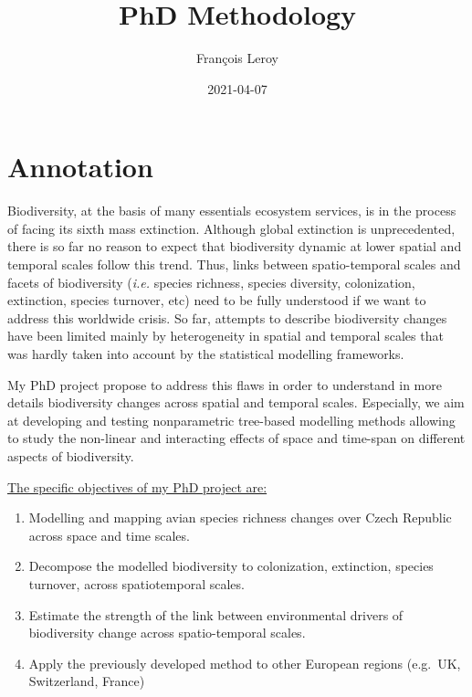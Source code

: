 \documentclass[
  12pt,
  oneside]{report}
\title{PhD Methodology}
\author{François Leroy}
\date{2021-04-07}
\providecommand{\tightlist}{%
  \setlength{\itemsep}{0pt}\setlength{\parskip}{0pt}}
\begin{document}
\maketitle


\cleardoublepage 
{}

{
\hypersetup{linkcolor=}
\setcounter{tocdepth}{1}
\tableofcontents
\newpage
}
\vspace{50mm}


\cleardoublepage 
{}


\hypertarget{annotation}{%
\chapter*{Annotation}\label{annotation}}

Biodiversity, at the basis of many essentials ecosystem services, is in the process of facing its sixth mass extinction. Although global extinction is unprecedented, there is so far no reason to expect that biodiversity dynamic at lower spatial and temporal scales follow this trend. Thus, links between
spatio-temporal scales and facets of biodiversity (\emph{i.e.} species richness, species diversity, colonization, extinction,
species turnover, etc) need to be fully understood if we want to address this worldwide crisis. So far,
attempts to describe biodiversity changes have been limited mainly by heterogeneity in spatial and
temporal scales that was hardly taken into account by the statistical modelling frameworks.

My PhD project propose to address this flaws in order to understand in more details biodiversity
changes across spatial and temporal scales. Especially, we aim at developing and testing nonparametric
tree-based modelling methods allowing to study the non-linear and interacting effects of
space and time-span on different aspects of biodiversity.

\underline{The specific objectives of my PhD project are:}

\begin{enumerate}
\def\labelenumi{\arabic{enumi}.}
\tightlist
\item
  Modelling and mapping avian species richness changes over Czech Republic across space and time
  scales.
\item
  Decompose the modelled biodiversity to colonization, extinction, species turnover, across spatiotemporal
  scales.
\item
  Estimate the strength of the link between environmental drivers of biodiversity change across
  spatio-temporal scales.
\item
  Apply the previously developed method to other European regions (e.g.~UK, Switzerland, France)
\end{enumerate}
\end{document}
